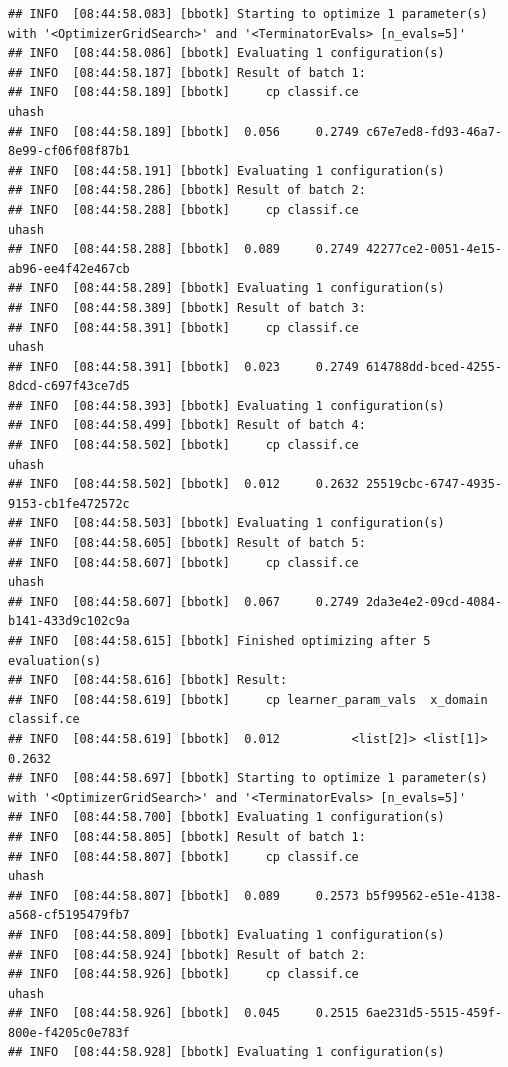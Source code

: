 \documentclass[
]{scrbook}
\begin{document}
\begin{verbatim}
## INFO  [08:44:58.083] [bbotk] Starting to optimize 1 parameter(s) with '<OptimizerGridSearch>' and '<TerminatorEvals> [n_evals=5]' 
## INFO  [08:44:58.086] [bbotk] Evaluating 1 configuration(s) 
## INFO  [08:44:58.187] [bbotk] Result of batch 1: 
## INFO  [08:44:58.189] [bbotk]     cp classif.ce                                uhash 
## INFO  [08:44:58.189] [bbotk]  0.056     0.2749 c67e7ed8-fd93-46a7-8e99-cf06f08f87b1 
## INFO  [08:44:58.191] [bbotk] Evaluating 1 configuration(s) 
## INFO  [08:44:58.286] [bbotk] Result of batch 2: 
## INFO  [08:44:58.288] [bbotk]     cp classif.ce                                uhash 
## INFO  [08:44:58.288] [bbotk]  0.089     0.2749 42277ce2-0051-4e15-ab96-ee4f42e467cb 
## INFO  [08:44:58.289] [bbotk] Evaluating 1 configuration(s) 
## INFO  [08:44:58.389] [bbotk] Result of batch 3: 
## INFO  [08:44:58.391] [bbotk]     cp classif.ce                                uhash 
## INFO  [08:44:58.391] [bbotk]  0.023     0.2749 614788dd-bced-4255-8dcd-c697f43ce7d5 
## INFO  [08:44:58.393] [bbotk] Evaluating 1 configuration(s) 
## INFO  [08:44:58.499] [bbotk] Result of batch 4: 
## INFO  [08:44:58.502] [bbotk]     cp classif.ce                                uhash 
## INFO  [08:44:58.502] [bbotk]  0.012     0.2632 25519cbc-6747-4935-9153-cb1fe472572c 
## INFO  [08:44:58.503] [bbotk] Evaluating 1 configuration(s) 
## INFO  [08:44:58.605] [bbotk] Result of batch 5: 
## INFO  [08:44:58.607] [bbotk]     cp classif.ce                                uhash 
## INFO  [08:44:58.607] [bbotk]  0.067     0.2749 2da3e4e2-09cd-4084-b141-433d9c102c9a 
## INFO  [08:44:58.615] [bbotk] Finished optimizing after 5 evaluation(s) 
## INFO  [08:44:58.616] [bbotk] Result: 
## INFO  [08:44:58.619] [bbotk]     cp learner_param_vals  x_domain classif.ce 
## INFO  [08:44:58.619] [bbotk]  0.012          <list[2]> <list[1]>     0.2632 
## INFO  [08:44:58.697] [bbotk] Starting to optimize 1 parameter(s) with '<OptimizerGridSearch>' and '<TerminatorEvals> [n_evals=5]' 
## INFO  [08:44:58.700] [bbotk] Evaluating 1 configuration(s) 
## INFO  [08:44:58.805] [bbotk] Result of batch 1: 
## INFO  [08:44:58.807] [bbotk]     cp classif.ce                                uhash 
## INFO  [08:44:58.807] [bbotk]  0.089     0.2573 b5f99562-e51e-4138-a568-cf5195479fb7 
## INFO  [08:44:58.809] [bbotk] Evaluating 1 configuration(s) 
## INFO  [08:44:58.924] [bbotk] Result of batch 2: 
## INFO  [08:44:58.926] [bbotk]     cp classif.ce                                uhash 
## INFO  [08:44:58.926] [bbotk]  0.045     0.2515 6ae231d5-5515-459f-800e-f4205c0e783f 
## INFO  [08:44:58.928] [bbotk] Evaluating 1 configuration(s) 

\end{verbatim}
\end{document}
